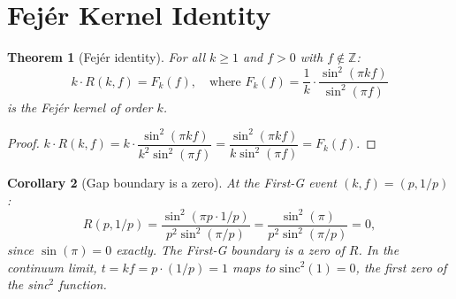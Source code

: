 \documentclass{amsart}
\newtheorem{theorem}{Theorem}
\newtheorem{corollary}[theorem]{Corollary}
\begin{document}
\section{Fej\'er Kernel Identity}

\begin{theorem}[Fej\'er identity]
For all $k \geq 1$ and $f > 0$ with $f \notin \mathbb{Z}$:
\[
  k \cdot R(k,f) = F_k(f),
  \quad \text{where } F_k(f) = \frac{1}{k} \cdot \frac{\sin^2(\pi k f)}{\sin^2(\pi f)}
\]
is the Fej\'er kernel of order $k$.
\end{theorem}

\begin{proof}
$k \cdot R(k,f) = k \cdot \dfrac{\sin^2(\pi k f)}{k^2 \sin^2(\pi f)}
= \dfrac{\sin^2(\pi k f)}{k \sin^2(\pi f)} = F_k(f)$.
\end{proof}

\begin{corollary}[Gap boundary is a zero]
At the First-G event $(k,f) = (p, 1/p)$:
\[
  R(p, 1/p) = \frac{\sin^2(\pi p \cdot 1/p)}{p^2 \sin^2(\pi/p)}
             = \frac{\sin^2(\pi)}{p^2 \sin^2(\pi/p)} = 0,
\]
since $\sin(\pi) = 0$ exactly. The First-G boundary is a zero of $R$.
In the continuum limit, $t = kf = p \cdot (1/p) = 1$ maps to $\mathrm{sinc}^2(1) = 0$,
the first zero of the sinc$^2$ function.
\end{corollary}
\end{document}
